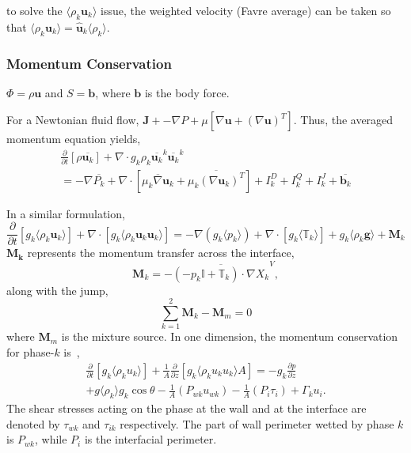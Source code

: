 to solve the $\langle \rho_k \mathbf{u}_{k} \rangle$ issue, the weighted velocity (Favre average) can be taken so that $\langle \rho_{k} \mathbf{u}_{k} \rangle = \mathbf{\hat{u}}_{k} \langle \rho_{k} \rangle$.
\subsubsection{Momentum Conservation}
$\Phi=\rho \mathbf{u}$ and $S = \mathbf{b}$, where $\mathbf{b}$ is the body force.

For a Newtonian fluid flow, $\mathbf{J} + -\nabla P + \mu[\nabla \mathbf{u} + {(\nabla \mathbf{u})}^{T}]$. Thus, the averaged momentum equation yields,
\begin{multline}
	\frac{\partial}{\partial t}[\rho \overline{\mathbf{u}_{k}}] + \nabla \cdot g_{k} \rho_{k} \overline{\mathbf{u}_k}^{k}\overline{\mathbf{u}_k}^{k}\\
	= -\nabla \overline{P_{k}} + \nabla \cdot {[\overline{\mu_{k} \nabla \mathbf{u}_{k}} + {\overline{\mu_{k} {(\nabla \mathbf{u}_{k})}^{T}}}]} + I^{D}_{k} + I^{Q}_{k} + I^{J}_{k} + \overline{\mathbf{b}_{k}}
\end{multline}

In a similar formulation,
\begin{equation}\label{gov_mom}
	\frac{\partial}{\partial t}[g_{k} \langle \rho_{k} \mathbf{u}_{k} \rangle] + \nabla \cdot [g_{k} \langle \rho_{k} \mathbf{u}_{k} \mathbf{u}_{k} \rangle] = 
	-\nabla(g_{k} \langle p_{k} \rangle) + \nabla \cdot [g_{k} \langle \mathbb{T}_{k} \rangle ] + g_{k}\langle\rho_{k} \mathbf{g} \rangle + \mathbf{M}_k
\end{equation}
$\mathbf{M_{k}}$ represents the momentum transfer across the interface,\
\begin{equation}
	\mathbf{M}_{k} = -\overline{(-p_{k}\mathbf{\mathbb{I}} + \mathbf{\mathbb{T}}_{k}) \cdot \nabla X_{k}}^{V},
\end{equation}
along with the jump,
\begin{equation}
	\sum_{k=1}^{2}\mathbf{M}_k - \mathbf{M}_m = 0
\end{equation}
where $\mathbf{M}_{m}$ is the mixture source.
In one dimension, the momentum conservation for phase-$k$ is~\cite{hewittModellingStrategiesTwoPhase2018},
\begin{multline}
\frac{\partial}{\partial t}[g_{k}\langle \rho_{k} u_{k}\rangle] + \frac{1}{A} \frac{\partial}{\partial z}[g_{k} \langle \rho_{k} u_{k} u_k\rangle A]
= - g_{k} \frac{\partial p}{\partial z}\\ + g\langle\rho_{k}\rangle g_{k} \cos \theta - \frac{1}{A} (P_{wk}u_{wk}) - \frac{1}{A} (P_i \tau_i) + \Gamma_k u_i.
\end{multline}
The shear stresses acting on the phase at the wall and at the interface are denoted by $\tau_{wk}$ and $\tau_{ik}$ respectively. The part of wall perimeter wetted by phase $k$ is $P_{wk}$, while $P_i$ is the interfacial perimeter.
